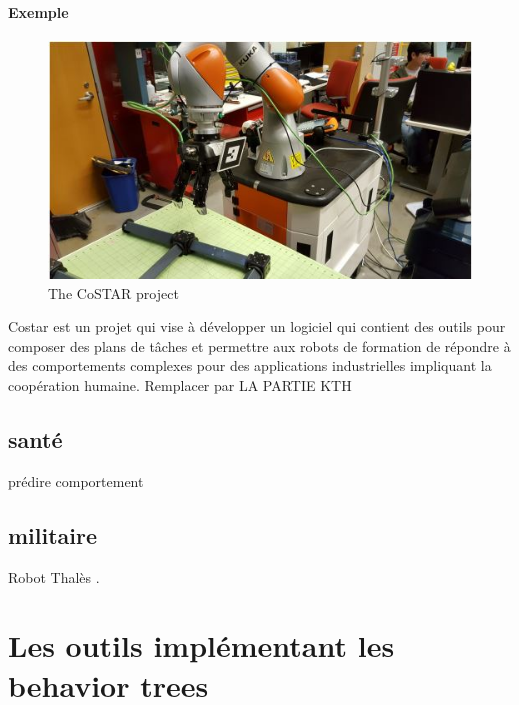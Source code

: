 \documentclass[titlepage]{article}
\begin{document}
		\paragraph{Exemple}
		\begin{figure}[h!]
			\includegraphics[width=\linewidth]{img/robotind.JPG}
			\caption{The CoSTAR project}
			\label{fig:civil}
		\end{figure}
		Costar est un projet qui vise à développer un logiciel qui contient des outils pour composer des plans de tâches et permettre aux robots de formation de répondre à des comportements complexes pour des applications industrielles impliquant la coopération humaine.
		Remplacer par LA PARTIE KTH
		
		\subsection{santé}
	prédire comportement
	
		\subsection{militaire}
	Robot Thalès \cite{mer_et_marine_2018}.

	\section{Les outils implémentant les behavior trees}
\end{document}
